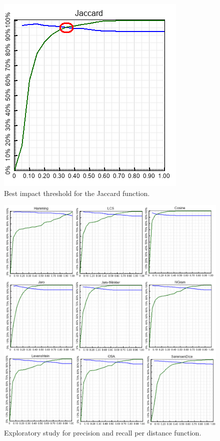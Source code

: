 \begin{figure}[h!] 
\centering 
\includegraphics[width=.5\textwidth]{figs/best_Jaccard.png}
\caption{Best impact threshold for the Jaccard function.}
\label{fig:best_jaccard}
\end{figure}


\begin{figure}[h!] 
\centering 
\includegraphics[width=1.0\textwidth]{figs/all.png}
\caption{Exploratory study for precision and recall per distance function.}
\label{fig:all}
\end{figure}


